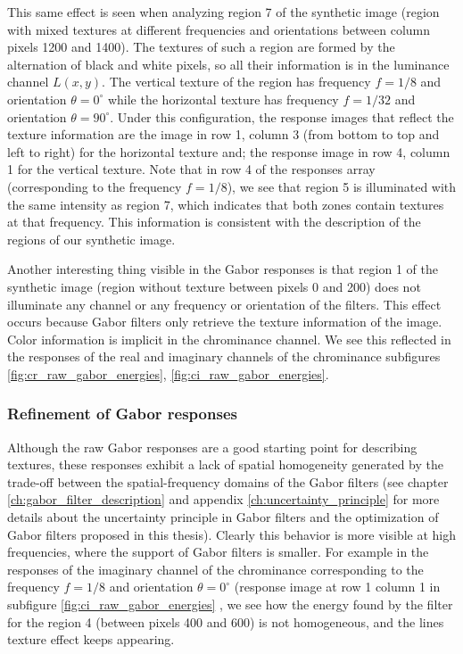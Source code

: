This same effect is seen when analyzing region 7 of the synthetic image (region with mixed textures at different frequencies and orientations between column pixels 1200 and 1400). The textures of such a region are formed by the alternation of black and white pixels, so all their information is in the luminance channel $L(x, y)$. The vertical texture of the region has frequency $f = 1/8$ and orientation $\theta = 0^\circ$ while the horizontal texture has frequency $f = 1/32$ and orientation $\theta = 90^\circ$. Under this configuration, the response images that reflect the texture information are the image in row 1, column 3  (from bottom to top and left to right) for the horizontal texture and; the response image in row 4, column 1 for the vertical texture. Note that in row 4 of the responses array (corresponding to the frequency $f = 1/8$), we see that region 5 is illuminated with the same intensity as region 7, which indicates that both zones contain textures at that frequency. This information is consistent with the description of the regions of our synthetic image.

Another interesting thing visible in the Gabor responses is that region 1 of the synthetic image (region without texture between pixels 0 and 200) does not illuminate any channel or any frequency or orientation of the filters. This effect occurs because Gabor filters only retrieve the texture information of the image. Color information is implicit in the chrominance channel. We see this reflected in the responses of the real and imaginary channels of the chrominance subfigures \ref{fig:cr_raw_gabor_energies}, \ref{fig:ci_raw_gabor_energies}. 


\subsubsection{Refinement of Gabor responses}

Although the raw Gabor responses are a good starting point for describing textures, these responses exhibit a lack of spatial homogeneity generated by the trade-off between the spatial-frequency domains of the Gabor filters (see chapter \ref{ch:gabor_filter_description} and appendix \ref{ch:uncertainty_principle} for more details about the uncertainty principle in Gabor filters and the optimization of  Gabor filters proposed in this thesis). Clearly this behavior is more visible at high frequencies, where the support of Gabor filters is smaller. For example in the responses of the imaginary channel of the chrominance corresponding to the frequency $f=1/8$ and orientation $\theta = 0^\circ$ (response image at row 1 column 1 in subfigure \ref{fig:ci_raw_gabor_energies} , we see how the energy found by the filter for the region 4 (between pixels 400 and 600) is not homogeneous, and the lines texture effect keeps appearing.

